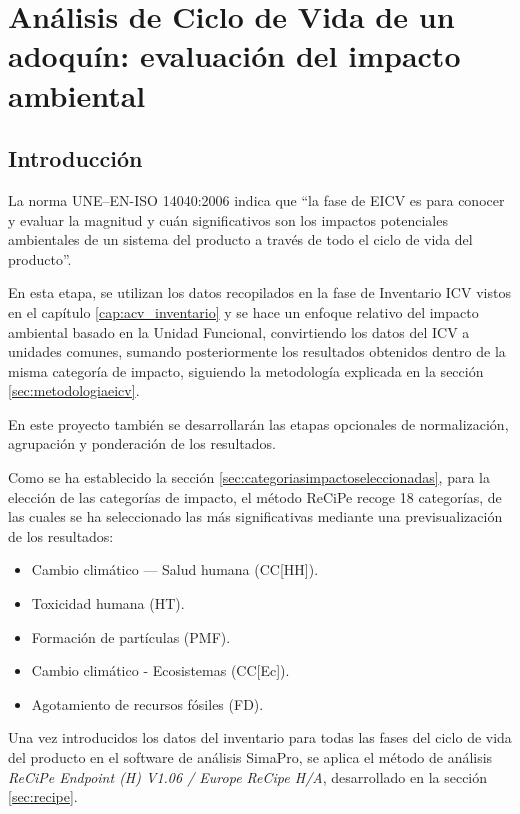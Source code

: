 \chapter{Análisis de Ciclo de Vida de un adoquín: evaluación del impacto ambiental}\label{cap:acv_evaluacion}

\section{Introducción}
La norma UNE–EN-ISO 14040:2006 \cite{iso14040} indica que ``la fase de EICV es para conocer y evaluar la magnitud y cuán significativos son los impactos potenciales ambientales de un sistema del producto a través de todo el ciclo de vida del producto''.

En esta etapa, se utilizan los datos recopilados en la fase de Inventario ICV vistos en el capítulo \ref{cap:acv_inventario} y se hace un enfoque relativo del impacto ambiental basado en la Unidad Funcional, convirtiendo los datos del ICV a unidades comunes, sumando posteriormente los resultados obtenidos dentro de la misma categoría de impacto, siguiendo la metodología explicada en la sección \ref{sec:metodologiaeicv}.

En este proyecto también se desarrollarán las etapas opcionales de normalización, agrupación y ponderación de los resultados.

Como se ha establecido la sección \ref{sec:categoriasimpactoseleccionadas}, para la elección de las categorías de impacto, el método ReCiPe recoge 18 categorías, de las cuales se ha seleccionado las más significativas mediante una previsualización de los resultados:

\begin{itemize}
  \item Cambio climático — Salud humana (CC[HH]).
  \item Toxicidad humana (HT).
  \item Formación de partículas (PMF).
  \item Cambio climático - Ecosistemas (CC[Ec]).
  \item Agotamiento de recursos fósiles (FD).
\end{itemize}

Una vez introducidos los datos del inventario para todas las fases del ciclo de vida del producto en el software de análisis SimaPro, se aplica el método de análisis \textit{ReCiPe Endpoint (H) V1.06 / Europe ReCipe H/A}, desarrollado en la sección \ref{sec:recipe}.

